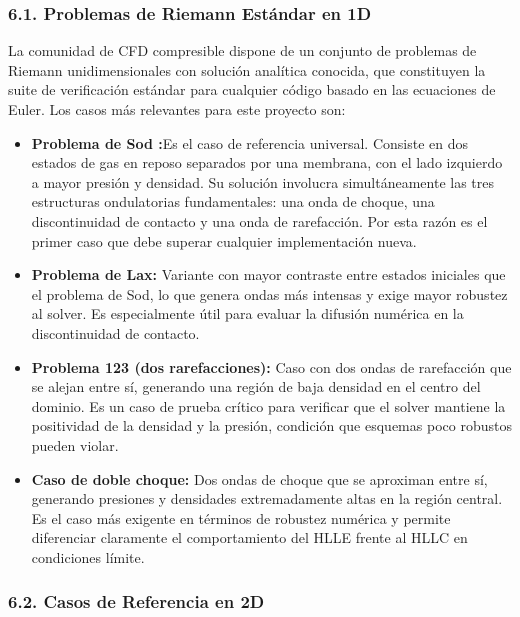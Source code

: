 \documentclass[11pt,openany]{book}
\begin{document}
\subsubsection{6.1. Problemas de Riemann Estándar en 1D}\textbf{}La comunidad de CFD compresible dispone de un conjunto de problemas de Riemann unidimensionales con solución analítica conocida, que constituyen la suite de verificación estándar para cualquier código basado en las ecuaciones de Euler. Los casos más relevantes para este proyecto son:

\begin{itemize}
    \item \textbf{Problema de Sod :}Es el caso de referencia universal. Consiste en dos estados de gas en reposo separados por una membrana, con el lado izquierdo a mayor presión y densidad. Su solución involucra simultáneamente las tres estructuras ondulatorias fundamentales: una onda de choque, una discontinuidad de contacto y una onda de rarefacción. Por esta razón es el primer caso que debe superar cualquier implementación nueva.

    \item \textbf{Problema de Lax: }Variante con mayor contraste entre estados iniciales que el problema de Sod, lo que genera ondas más intensas y exige mayor robustez al solver. Es especialmente útil para evaluar la difusión numérica en la discontinuidad de contacto.

    \item \textbf{Problema 123 (dos rarefacciones): }Caso con dos ondas de rarefacción que se alejan entre sí, generando una región de baja densidad en el centro del dominio. Es un caso de prueba crítico para verificar que el solver mantiene la positividad de la densidad y la presión, condición que esquemas poco robustos pueden violar.

    \item \textbf{Caso de doble choque: }Dos ondas de choque que se aproximan entre sí, generando presiones y densidades extremadamente altas en la región central. Es el caso más exigente en términos de robustez numérica y permite diferenciar claramente el comportamiento del HLLE frente al HLLC en condiciones límite.

\end{itemize}

\subsubsection{6.2. Casos de Referencia en 2D}
\end{document}
